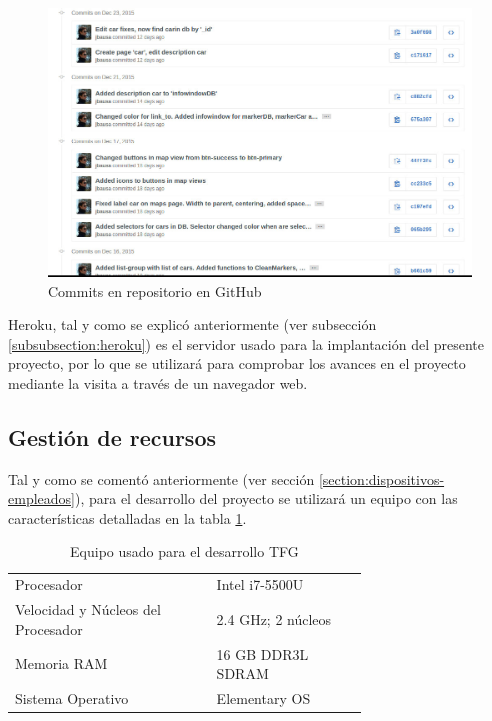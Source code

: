 \begin{figure}[H]
\centering
\includegraphics[width=15cm, fbox={\fboxrule} 4mm]{images/05-resultados/02-git.jpg}
\caption{Commits en repositorio en GitHub}
\label{fig:github}
\end{figure}
	
	Heroku, tal y como se explicó anteriormente (ver subsección \ref{subsubsection:heroku}) es el servidor usado para la implantación del presente proyecto, por lo que se utilizará para comprobar los avances en el proyecto mediante la visita a través de un navegador web.
	
	\subsection{Gestión de recursos}
	Tal y como se comentó anteriormente (ver sección \ref{section:dispositivos-empleados}), para el desarrollo del proyecto se utilizará un equipo con las características detalladas en la tabla \ref{tab:portatil2}. 
	
	\begin{table}[H]
	  \centering 
	  \begin{tabular}{p{0.4\linewidth}p{0.3\linewidth}}
	    \toprule
		Procesador 							& Intel i7-5500U								\\
		Velocidad y Núcleos del Procesador & 2.4 GHz; 2 núcleos 							\\
		Memoria RAM 						& 16 \ac{GB} \ac{DDR}3L \ac{SDRAM} 			\\
		Sistema Operativo					& Elementary \ac{OS} 							\\
	    \hline
	  \end{tabular}
	  \caption{Equipo usado para el desarrollo \ac{TFG}}
	  \label{tab:portatil2}
	\end{table}
	
